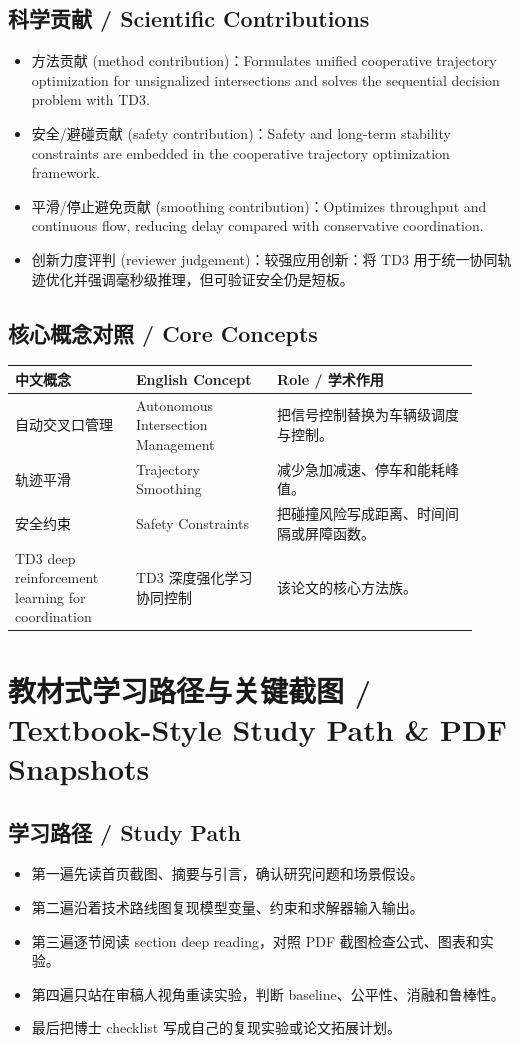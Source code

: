 \documentclass[UTF8,a4paper,11pt,fontset=fandol]{ctexart}
\begin{document}
\subsection{科学贡献 / Scientific Contributions}
\begin{itemize}
\item 方法贡献 (method contribution)：Formulates unified cooperative trajectory optimization for unsignalized intersections and solves the sequential decision problem with TD3.
\item 安全/避碰贡献 (safety contribution)：Safety and long-term stability constraints are embedded in the cooperative trajectory optimization framework.
\item 平滑/停止避免贡献 (smoothing contribution)：Optimizes throughput and continuous flow, reducing delay compared with conservative coordination.
\item 创新力度评判 (reviewer judgement)：较强应用创新：将 TD3 用于统一协同轨迹优化并强调毫秒级推理，但可验证安全仍是短板。
\end{itemize}


\subsection{核心概念对照 / Core Concepts}
\begin{longtable}{p{0.24\linewidth}p{0.28\linewidth}p{0.40\linewidth}}
\toprule
中文概念 & English Concept & Role / 学术作用\\
\midrule
自动交叉口管理 & Autonomous Intersection Management & 把信号控制替换为车辆级调度与控制。 \\
轨迹平滑 & Trajectory Smoothing & 减少急加减速、停车和能耗峰值。 \\
安全约束 & Safety Constraints & 把碰撞风险写成距离、时间间隔或屏障函数。 \\
TD3 deep reinforcement learning for coordination & TD3 深度强化学习协同控制 & 该论文的核心方法族。 \\
\bottomrule
\end{longtable}

\section{教材式学习路径与关键截图 / Textbook-Style Study Path \& PDF Snapshots}
\subsection{学习路径 / Study Path}
\begin{itemize}
\item 第一遍先读首页截图、摘要与引言，确认研究问题和场景假设。
\item 第二遍沿着技术路线图复现模型变量、约束和求解器输入输出。
\item 第三遍逐节阅读 section deep reading，对照 PDF 截图检查公式、图表和实验。
\item 第四遍只站在审稿人视角重读实验，判断 baseline、公平性、消融和鲁棒性。
\item 最后把博士 checklist 写成自己的复现实验或论文拓展计划。
\end{itemize}
\end{document}
